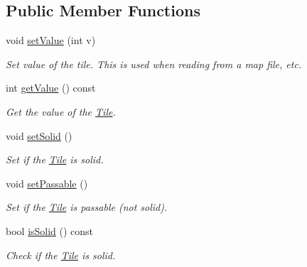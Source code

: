 \subsection*{Public Member Functions}
\begin{DoxyCompactItemize}
\item 
void \hyperlink{classTile_ae3d9e4ace265389dd0e0cf3d62ad6ff3}{set\+Value} (int v)\hypertarget{classTile_ae3d9e4ace265389dd0e0cf3d62ad6ff3}{}\label{classTile_ae3d9e4ace265389dd0e0cf3d62ad6ff3}

\begin{DoxyCompactList}\small\item\em Set value of the tile. This is used when reading from a map file, etc. \end{DoxyCompactList}\item 
int \hyperlink{classTile_aa426a6476fcf257bd0f79da4c3ed06aa}{get\+Value} () const \hypertarget{classTile_aa426a6476fcf257bd0f79da4c3ed06aa}{}\label{classTile_aa426a6476fcf257bd0f79da4c3ed06aa}

\begin{DoxyCompactList}\small\item\em Get the value of the \hyperlink{classTile}{Tile}. \end{DoxyCompactList}\item 
void \hyperlink{classTile_a3deac8e6d0ebd7b8352248201d264c38}{set\+Solid} ()\hypertarget{classTile_a3deac8e6d0ebd7b8352248201d264c38}{}\label{classTile_a3deac8e6d0ebd7b8352248201d264c38}

\begin{DoxyCompactList}\small\item\em Set if the \hyperlink{classTile}{Tile} is solid. \end{DoxyCompactList}\item 
void \hyperlink{classTile_a067099478c20b3f2fb56bc1c042a1e4e}{set\+Passable} ()\hypertarget{classTile_a067099478c20b3f2fb56bc1c042a1e4e}{}\label{classTile_a067099478c20b3f2fb56bc1c042a1e4e}

\begin{DoxyCompactList}\small\item\em Set if the \hyperlink{classTile}{Tile} is passable (not solid). \end{DoxyCompactList}\item 
bool \hyperlink{classTile_a8e67a56637124f73f3da572178dd4838}{is\+Solid} () const \hypertarget{classTile_a8e67a56637124f73f3da572178dd4838}{}\label{classTile_a8e67a56637124f73f3da572178dd4838}

\begin{DoxyCompactList}\small\item\em Check if the \hyperlink{classTile}{Tile} is solid. \end{DoxyCompactList}\end{DoxyCompactItemize}


